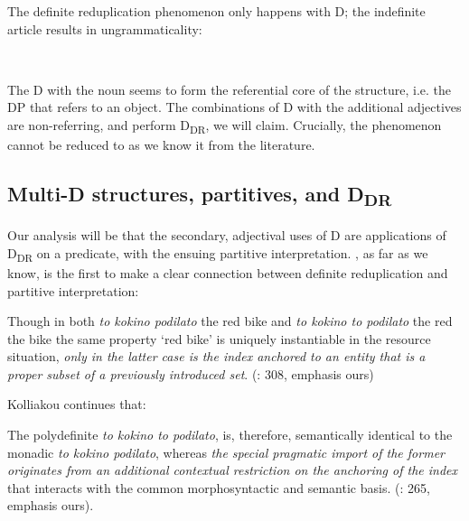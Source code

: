 \documentclass[output=paper,
modfonts
]{langscibook}
\begin{document}
The definite reduplication phenomenon only happens with D; the indefinite article results in ungrammaticality: 

\ea\label{ex:etxeberria:44}  \\
\z
\z

The D with the noun seems to form the referential core of the structure, i.e.  the DP that refers to an object. The combinations of D with the additional adjectives are non-referring, and perform D\textsubscript{DR}, we will claim. Crucially, the phenomenon cannot be reduced to  as we know it from the literature.

\subsection{Multi-D structures, partitives, and D\textsubscript{DR}}

Our analysis will be that the secondary, adjectival uses of D are applications of D\textsubscript{DR} on a predicate, with the ensuing partitive interpretation. \citet{kolliakou2004}, as far as we know, is the first to make a clear connection between definite reduplication and partitive interpretation: 

\begin{displayquote}
Though in both \textit{to kokino podilato} {\ob}the red bike{\cb} and \textit{to kokino to podilato} {\ob}the red the bike{\cb} the same property `red bike' is uniquely instantiable {\ob}in the resource situation{\cb}, \textit{only in the latter case is the index anchored to an entity that is a proper subset of a previously introduced set}. (\citealt{kolliakou2004}: 308, emphasis ours)
\end{displayquote}

Kolliakou continues that: 

\begin{displayquote}
The polydefinite \textit{to kokino to podilato}, is, therefore, semantically identical to the monadic \textit{to kokino podilato}, whereas \textit{the special pragmatic import of the former originates from an additional contextual restriction on the anchoring of the index} that interacts with the common morphosyntactic and semantic basis. (\citealt{kolliakou2004}: 265, emphasis ours).
\end{displayquote}
\end{document}
